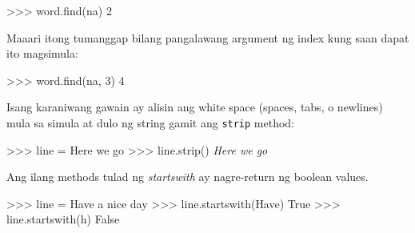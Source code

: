 \documentclass[10pt,]{book}
\newenvironment{Shaded}{}{}
\newcommand{\CommentTok}[1]{\textcolor[rgb]{0.38,0.63,0.69}{\textit{#1}}}
\newcommand{\DecValTok}[1]{\textcolor[rgb]{0.25,0.63,0.44}{#1}}
\newcommand{\NormalTok}[1]{#1}
\newcommand{\OperatorTok}[1]{\textcolor[rgb]{0.40,0.40,0.40}{#1}}
\newcommand{\StringTok}[1]{\textcolor[rgb]{0.25,0.44,0.63}{#1}}
\newcommand{\VariableTok}[1]{\textcolor[rgb]{0.10,0.09,0.49}{#1}}
\begin{document}
\begin{Shaded}
\begin{Highlighting}[]
\OperatorTok{\textgreater{}\textgreater{}\textgreater{}}\NormalTok{ word.find(}\StringTok{\textquotesingle{}na\textquotesingle{}}\NormalTok{)}
\DecValTok{2}
\end{Highlighting}
\end{Shaded}

Maaari itong tumanggap bilang pangalawang argument ng index kung saan
dapat ito magsimula:

 

\begin{Shaded}
\begin{Highlighting}[]
\OperatorTok{\textgreater{}\textgreater{}\textgreater{}}\NormalTok{ word.find(}\StringTok{\textquotesingle{}na\textquotesingle{}}\NormalTok{, }\DecValTok{3}\NormalTok{)}
\DecValTok{4}
\end{Highlighting}
\end{Shaded}

Isang karaniwang gawain ay alisin ang white space (spaces, tabs, o
newlines) mula sa simula at dulo ng string gamit ang \texttt{strip}
method:

\begin{Shaded}
\begin{Highlighting}[]
\OperatorTok{\textgreater{}\textgreater{}\textgreater{}}\NormalTok{ line }\OperatorTok{=} \StringTok{\textquotesingle{}  Here we go  \textquotesingle{}}
\OperatorTok{\textgreater{}\textgreater{}\textgreater{}}\NormalTok{ line.strip()}
\CommentTok{\textquotesingle{}Here we go\textquotesingle{}}
\end{Highlighting}
\end{Shaded}

Ang ilang methods tulad ng \emph{startswith} ay nagre-return ng boolean
values.

\begin{Shaded}
\begin{Highlighting}[]
\OperatorTok{\textgreater{}\textgreater{}\textgreater{}}\NormalTok{ line }\OperatorTok{=} \StringTok{\textquotesingle{}Have a nice day\textquotesingle{}}
\OperatorTok{\textgreater{}\textgreater{}\textgreater{}}\NormalTok{ line.startswith(}\StringTok{\textquotesingle{}Have\textquotesingle{}}\NormalTok{)}
\VariableTok{True}
\OperatorTok{\textgreater{}\textgreater{}\textgreater{}}\NormalTok{ line.startswith(}\StringTok{\textquotesingle{}h\textquotesingle{}}\NormalTok{)}
\VariableTok{False}
\end{Highlighting}
\end{Shaded}
\end{document}
